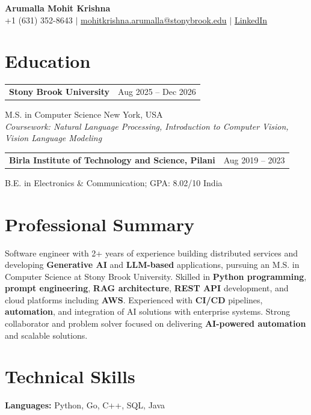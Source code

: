 \documentclass[letterpaper,10pt]{article}
\makeatletter
\newcommand{\entry}[2]{%
  \noindent
  \begin{tabularx}{\linewidth}
    {@{}>{\raggedright\arraybackslash}X@{\hspace{6pt}}r@{}}
    \textbf{#1} & #2
  \end{tabularx}\par
}
\makeatother
\begin{document}
\begin{center}
    {\LARGE\bfseries Arumalla Mohit Krishna}\\[3pt]
    +1 (631) 352-8643 $|$
    \href{mailto:mohitkrishna.arumalla@stonybrook.edu}
    {mohitkrishna.arumalla@stonybrook.edu} $|$
    \href{https://linkedin.com/in/mohit-krishna-arumalla}
    {LinkedIn}
\end{center}
\vspace{-8pt}

\section{Education}

\entry
  {\textbf{Stony Brook University}}
  {Aug 2025 -- Dec 2026}

M.S. in Computer Science \hfill New York, USA\\
\textit{
Coursework: Natural Language Processing,
Introduction to Computer Vision, Vision Language Modeling
}
\vspace{3pt}

\entry
  {\textbf{Birla Institute of Technology and Science, Pilani}}
  {Aug 2019 -- 2023}

B.E. in Electronics \& Communication; GPA: 8.02/10 \hfill India
\section{Professional Summary}

Software engineer with 2+ years of experience building distributed services and developing \textbf{Generative AI} and \textbf{LLM-based} applications, pursuing an M.S. in Computer Science at Stony Brook University. Skilled in \textbf{Python programming}, \textbf{prompt engineering}, \textbf{RAG architecture}, \textbf{REST API} development, and cloud platforms including \textbf{AWS}. Experienced with \textbf{CI/CD} pipelines, \textbf{automation}, and integration of AI solutions with enterprise systems. Strong collaborator and problem solver focused on delivering \textbf{AI-powered automation} and scalable solutions.

\section{Technical Skills}

\textbf{Languages:}
Python, Go, C++, SQL, Java\\
\end{document}
